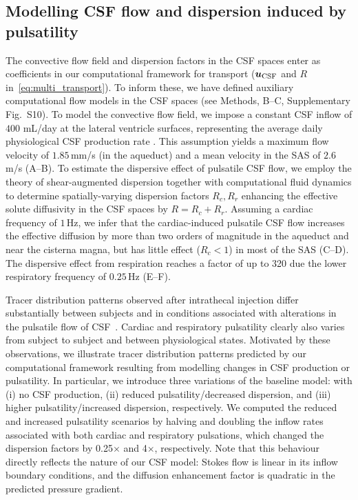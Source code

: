 \documentclass[fleqn,10pt]{wlscirep}
\begin{document}
\subsection*{Modelling CSF flow and dispersion induced by pulsatility}

The convective flow field and dispersion factors in the CSF spaces
enter as coefficients in our computational framework for transport
(${\bm u}_{\rm CSF}$ and $R$ in~\eqref{eq:multi_transport}). To inform
these, we have defined auxiliary computational flow models in the CSF
spaces (see Methods, B--C, Supplementary Fig.~S10). 
To model the convective flow field, we impose a constant
CSF inflow of $400$ mL/day at the lateral ventricle surfaces,
representing the average daily physiological CSF production rate
\cite{lehtinen2013choroid}. This assumption yields a maximum flow
velocity of $1.85\,$mm/s (in the aqueduct) and a mean velocity in the
SAS of $2.6$ \textmu m/s (A--B). To estimate the
dispersive effect of pulsatile CSF flow, we employ the theory of
shear-augmented dispersion together with computational fluid dynamics
to determine spatially-varying dispersion factors $R_c, R_r$ enhancing
the effective solute diffusivity in the CSF spaces by $R = R_c +
R_r$. Assuming a cardiac frequency of $1\,$Hz, we infer that the
cardiac-induced pulsatile CSF flow increases the effective diffusion
by more than two orders of magnitude in the aqueduct and near the
cisterna magna, but has little effect ($R_c < 1$) in most of the SAS
(C--D). The dispersive effect from respiration
reaches a factor of up to 320 due the lower respiratory frequency of
$0.25\,$Hz (E--F).
  
Tracer distribution patterns observed after intrathecal injection
differ substantially between subjects and in conditions associated
with alterations in the pulsatile flow of CSF~\cite{ringstad2018brain,
  eide2021direction, eide2021impaired, eide2022altered}. Cardiac and
respiratory pulsatility clearly also varies from subject to subject
and between physiological states. Motivated by these observations, we
illustrate tracer distribution patterns predicted by our computational
framework resulting from modelling changes in CSF production or
pulsatility. 
%
In particular, we introduce three variations of the
baseline model: with (i) no CSF production, (ii) reduced
pulsatility/decreased dispersion, and (iii) higher
pulsatility/increased dispersion, respectively. We computed the
reduced and increased pulsatility scenarios by halving and doubling
the inflow rates associated with both cardiac and respiratory
pulsations, which changed the dispersion factors by 0.25$\times$ and
4$\times$, respectively. Note that this behaviour directly reflects
the nature of our CSF model: Stokes flow is linear in its inflow
boundary conditions, and the diffusion enhancement factor is quadratic
in the predicted pressure gradient.
\end{document}
